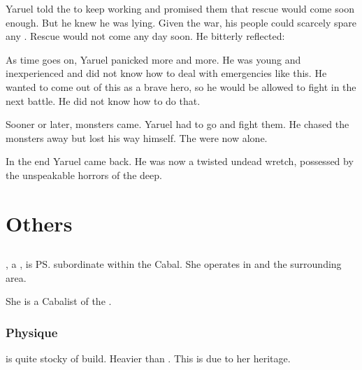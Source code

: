 Yaruel told the \humans to keep working and promised them that rescue would come soon enough.
But he knew he was lying. 
Given the war, his people could scarcely spare any \resphain. 
Rescue would not come any day soon. 
He bitterly reflected:

As time goes on, Yaruel panicked more and more. 
He was young and inexperienced and did not know how to deal with emergencies like this. 
He wanted to come out of this as a brave hero, so he would be allowed to fight in the next battle.
He did not know how to do that.

Sooner or later, monsters came.
Yaruel had to go and fight them.
He chased the monsters away but lost his way himself.
The \humans were now alone.

In the end Yaruel came back. 
He was now a twisted undead wretch, possessed by the unspeakable horrors of the deep.























\chapter{Others}
\section{\Achsah}
\Achsah{}, a \resvil{}, is \ps{\Teshrial} subordinate within the Cabal. 
She operates in \Malcur and the surrounding area. 

She is a Cabalist of the . 







\subsection{Physique}
\Achsah{} is quite stocky of build. 
Heavier than \Teshrial. 
This is due to her \nephilic{} heritage. 







